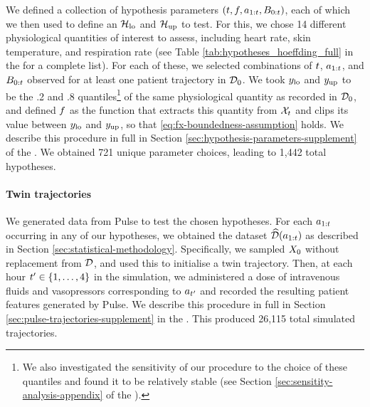 We defined a collection of hypothesis parameters $(t, f, a_{1:t}, B_{0:t})$, each of which we then used to define an $\mathcal{H}_{\mathrm{lo}}$ and $\mathcal{H}_{\mathrm{up}}$ to test.
For this, we chose 14 different physiological quantities of interest to assess, including heart rate, skin temperature, and respiration rate (see Table \ref{tab:hypotheses_hoeffding_full} in the \AppendixName for a complete list).
For each of these, we selected combinations of $t$, $a_{1:t}$, and $B_{0:t}$ observed for at least one patient trajectory in $\mathcal{D}_0$.
We took \(y_{\mathrm{lo}}\) and \(y_{\mathrm{up}}\) to be the .2 and .8 quantiles\footnote{We also investigated the sensitivity of our procedure to the choice of these quantiles and found it to be relatively stable (see Section \ref{sec:sensitity-analysis-appendix} of the \AppendixName).} of the same physiological quantity as recorded in $\mathcal{D}_0$, and   defined $f$ as the function that extracts this quantity from \(\mathcal{X}_t\) and clips its value between \(y_{\mathrm{lo}}\) and \(y_{\mathrm{up}}\), so that \eqref{eq:fx-boundedness-assumption} holds.
We describe this procedure in full in Section \ref{sec:hypothesis-parameters-supplement} of the \AppendixName.
%
We obtained 721 unique parameter choices, leading to 1,442 total hypotheses.
%
%

%

%
%
%

%
%
%


%


%
%
%
%
%
%
%
%
%
%
%
%
%
%
%


%


%
%
%
%
%
%
%
%
%
%
%
%
%
%
%
%
%
%
%
%
%
%
%
%
%
%
%
%
%

%

\paragraph{Twin trajectories}

We generated data from Pulse to test the chosen hypotheses.
For each $a_{1:t}$ occurring in any of our hypotheses, we obtained the dataset $\widehat{\mathcal{D}}(a_{1:t})$ as described in Section \ref{sec:statistical-methodology}.
Specifically, we sampled $X_0$ without replacement from $\mathcal{D}$, and used this to initialise a twin trajectory.
Then, at each hour $t' \in \{1, \ldots, 4\}$ in the simulation, we administered a dose of intravenous fluids and vasopressors corresponding to $a_{t'}$ and recorded the resulting patient features generated by Pulse. 
%
%
We describe this procedure in full in Section \ref{sec:pulse-trajectories-supplement} in the \AppendixName.
This produced 26,115 total simulated trajectories.
%
%
%

